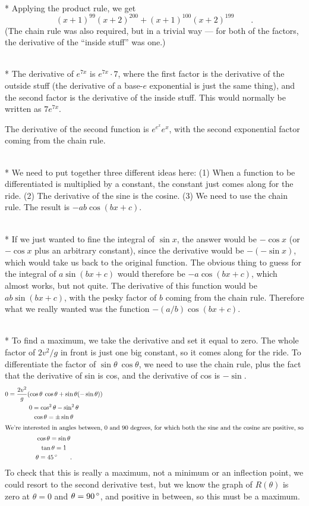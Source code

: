\\*
Applying the product rule, we get
\begin{equation*}
  (x+1)^{99}(x+2)^{200}+  (x+1)^{100}(x+2)^{199} \qquad .
\end{equation*}
(The chain rule was also required, but in a trivial way --- for both of
the factors, the derivative of the ``inside stuff'' was one.)

\\*
The derivative of $e^{7x}$ is $e^{7x}\cdot 7$, where the first factor is the
derivative of the outside stuff (the derivative of a base-$e$ exponential is
just the same thing), and the second factor is the derivative of the inside stuff.
This would normally be written as $7e^{7x}$.

The  derivative of the second function is $e^{e^x}e^x$, with the second exponential factor coming
from the chain rule.

\\*
We need to put together three different ideas here: (1) When a function to be
differentiated is multiplied by a constant, the constant just comes along for the ride.
(2) The derivative of the sine is the cosine. (3) We need to use the chain rule.
The result is $-ab\cos(bx+c)$.

\\*
If we just wanted to fine the integral of $\sin x$, the answer would be $-\cos x$ (or
$-\cos x$ plus an arbitrary constant), since the derivative would be $-(-\sin x)$, which
would take us back to the original function. The obvious thing to guess for the
integral of $a\sin(bx+c)$ would therefore be $-a\cos(bx+c)$, which almost works,
but not quite. The derivative of this function would be $ab\sin(bx+c)$, with the
pesky factor of $b$ coming from the chain rule. Therefore what we really wanted was
the function $-(a/b)\cos(bx+c)$.

\\*
To find a maximum, we take the derivative and set it equal to zero. The whole factor
of $2v^2/g$ in front is just one big constant, so it comes along for the ride. To differentiate
the factor of $\sin\theta\:\cos\theta$, we need to use the chain rule, plus the fact that
the derivative of sin is cos, and the derivative of cos is $-\sin$.
\begin{gather*}
  0 = \frac{2v^2}{g} (\cos\theta\:\cos\theta+\sin\theta(-\sin\theta)) \\
  0 = \cos^2\theta-\sin^2\theta \\
  \cos\theta = \pm \sin\theta \\
\intertext{We're interested in angles between, 0 and 90 degrees, for which both the sine and
the cosine are positive, so}
  \cos\theta = \sin\theta \\
  \tan\theta = 1\\
  \theta = 45\,^{\circ} \qquad .
\end{gather*}
To check that this is really a maximum, not a minimum or an inflection point, we could resort
to the second derivative test, but we know the graph of $R(\theta)$ is zero at $\theta=0$
and $\theta=90\,^{\circ}$, and positive in between, so this must be a maximum.

